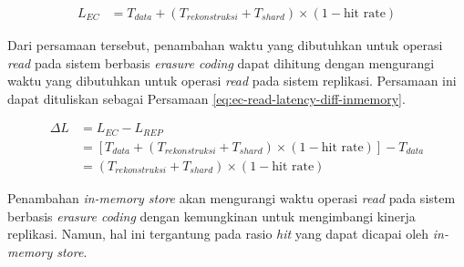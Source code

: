 \begin{enumerate}
	      \begin{align}
		      L_{EC} & = T_{data} + (T_{rekonstruksi} + T_{shard}) \times (1 - \text{hit rate})
		      \label{eq:ec-read-latency-inmemory}
	      \end{align}

	      Dari persamaan tersebut, penambahan waktu yang dibutuhkan untuk operasi \textit{read} pada sistem berbasis \textit{erasure coding} dapat dihitung dengan mengurangi waktu yang dibutuhkan untuk operasi \textit{read} pada sistem replikasi. Persamaan ini dapat dituliskan sebagai Persamaan \ref{eq:ec-read-latency-diff-inmemory}.

	      \begin{align}
		      \Delta L & = L_{EC} - L_{REP}                                                                               \\
		               & = \left[T_{data} + (T_{rekonstruksi} + T_{shard}) \times (1 - \text{hit rate})\right] - T_{data} \\
		               & = (T_{rekonstruksi} + T_{shard}) \times (1 - \text{hit rate})
		      \label{eq:ec-read-latency-diff-inmemory}
	      \end{align}

	      Penambahan \textit{in-memory store} akan mengurangi waktu operasi \textit{read} pada sistem berbasis \textit{erasure coding} dengan kemungkinan untuk mengimbangi kinerja replikasi. Namun, hal ini tergantung pada rasio \textit{hit} yang dapat dicapai oleh \textit{in-memory store}.



\end{enumerate}